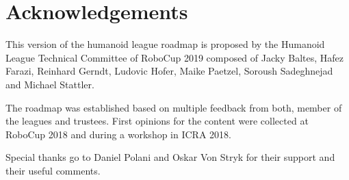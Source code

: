 \documentclass{article}
\begin{document}
\section*{Acknowledgements}
This version of the humanoid league roadmap is proposed by the Humanoid League
Technical Committee of RoboCup 2019 composed of Jacky Baltes, Hafez Farazi,
Reinhard Gerndt, Ludovic Hofer, Maike Paetzel, Soroush Sadeghnejad and Michael
Stattler.

The roadmap was established based on multiple feedback from both, member of the
leagues and trustees. First opinions for the content were collected at RoboCup
2018 and during a workshop in ICRA 2018.

Special thanks go to Daniel Polani and Oskar Von Stryk for their support and
their useful comments.


\newpage

\printbibliography
\end{document}
